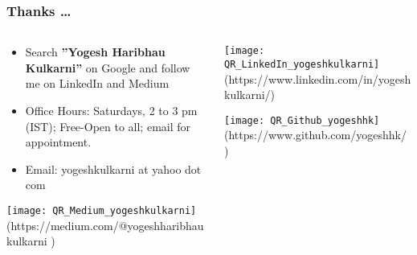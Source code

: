 \begin{frame}[fragile]\frametitle{Thanks \ldots}
\begin{columns}
    \begin{column}[T]{0.5\linewidth}
		\begin{itemize}
		\item Search {\Large \bf ''Yogesh Haribhau Kulkarni''} on Google and follow me on LinkedIn and Medium
		\item Office Hours: Saturdays, 2 to 3 pm (IST); Free-Open to all; email for appointment.
		\item Email: yogeshkulkarni at yahoo dot com
		\end{itemize}

		\begin{center}
		\texttt{[image: QR\_Medium\_yogeshkulkarni]}
				{\tiny (https://medium.com/@yogeshharibhaukulkarni )}	 %
								
		\end{center}			
    \end{column}
    \begin{column}[T]{0.5\linewidth}
		\begin{center}
		\texttt{[image: QR\_LinkedIn\_yogeshkulkarni]}
				{\tiny (https://www.linkedin.com/in/yogeshkulkarni/)} %
				
		\texttt{[image: QR\_Github\_yogeshhk]}
				{\tiny (https://www.github.com/yogeshhk/ )}	 %
								
		\end{center}	
    \end{column}
  \end{columns}
\end{frame}